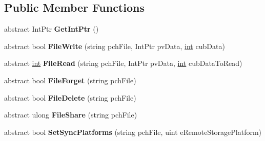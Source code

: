 \subsection*{Public Member Functions}
\begin{DoxyCompactItemize}
\item 
\hypertarget{classValve_1_1Steamworks_1_1ISteamRemoteStorage_a2823b5a9f48055fb48e53a9795ac22cb}{}abstract Int\+Ptr {\bfseries Get\+Int\+Ptr} ()\label{classValve_1_1Steamworks_1_1ISteamRemoteStorage_a2823b5a9f48055fb48e53a9795ac22cb}

\item 
\hypertarget{classValve_1_1Steamworks_1_1ISteamRemoteStorage_abe856b4ccbc1b51c34a68ddb4494edcc}{}abstract bool {\bfseries File\+Write} (string pch\+File, Int\+Ptr pv\+Data, \hyperlink{SDL__thread_8h_a6a64f9be4433e4de6e2f2f548cf3c08e}{int} cub\+Data)\label{classValve_1_1Steamworks_1_1ISteamRemoteStorage_abe856b4ccbc1b51c34a68ddb4494edcc}

\item 
\hypertarget{classValve_1_1Steamworks_1_1ISteamRemoteStorage_a135c82b67bf3104d40b213e460def316}{}abstract \hyperlink{SDL__thread_8h_a6a64f9be4433e4de6e2f2f548cf3c08e}{int} {\bfseries File\+Read} (string pch\+File, Int\+Ptr pv\+Data, \hyperlink{SDL__thread_8h_a6a64f9be4433e4de6e2f2f548cf3c08e}{int} cub\+Data\+To\+Read)\label{classValve_1_1Steamworks_1_1ISteamRemoteStorage_a135c82b67bf3104d40b213e460def316}

\item 
\hypertarget{classValve_1_1Steamworks_1_1ISteamRemoteStorage_a4286e46a677dedf1807dafc53823a579}{}abstract bool {\bfseries File\+Forget} (string pch\+File)\label{classValve_1_1Steamworks_1_1ISteamRemoteStorage_a4286e46a677dedf1807dafc53823a579}

\item 
\hypertarget{classValve_1_1Steamworks_1_1ISteamRemoteStorage_a4118a22cf4a4c10622624c4cef928daa}{}abstract bool {\bfseries File\+Delete} (string pch\+File)\label{classValve_1_1Steamworks_1_1ISteamRemoteStorage_a4118a22cf4a4c10622624c4cef928daa}

\item 
\hypertarget{classValve_1_1Steamworks_1_1ISteamRemoteStorage_ab3ec77a8b320c470b4e9746215833ccd}{}abstract ulong {\bfseries File\+Share} (string pch\+File)\label{classValve_1_1Steamworks_1_1ISteamRemoteStorage_ab3ec77a8b320c470b4e9746215833ccd}

\item 
\hypertarget{classValve_1_1Steamworks_1_1ISteamRemoteStorage_a8522f36ac7183f00d32b1de81b45a917}{}abstract bool {\bfseries Set\+Sync\+Platforms} (string pch\+File, uint e\+Remote\+Storage\+Platform)\label{classValve_1_1Steamworks_1_1ISteamRemoteStorage_a8522f36ac7183f00d32b1de81b45a917}


\end{DoxyCompactItemize}
